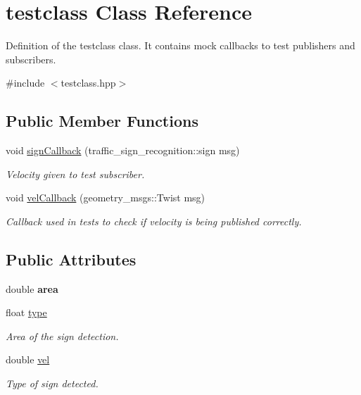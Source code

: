\hypertarget{classtestclass}{}\section{testclass Class Reference}
\label{classtestclass}


Definition of the testclass class. It contains mock callbacks to test publishers and subscribers.  




{\ttfamily \#include $<$testclass.\+hpp$>$}

\subsection*{Public Member Functions}
\begin{DoxyCompactItemize}
\item 
void \hyperlink{classtestclass_ae352e9aa7c67eefb21fb59bbef70102d}{sign\+Callback} (traffic\+\_\+sign\+\_\+recognition\+::sign msg)
\begin{DoxyCompactList}\small\item\em Velocity given to test subscriber. \end{DoxyCompactList}\item 
void \hyperlink{classtestclass_adcd92913608e31a80dccd729a0d8b0d6}{vel\+Callback} (geometry\+\_\+msgs\+::\+Twist msg)
\begin{DoxyCompactList}\small\item\em Callback used in tests to check if velocity is being published correctly. \end{DoxyCompactList}\end{DoxyCompactItemize}
\subsection*{Public Attributes}
\begin{DoxyCompactItemize}
\item 
double {\bfseries area}\hypertarget{classtestclass_ab9124711e687a763fea6b8c055b76b2a}{}\label{classtestclass_ab9124711e687a763fea6b8c055b76b2a}

\item 
float \hyperlink{classtestclass_a32d677c7bed3b81b99c354761f4c175a}{type}\hypertarget{classtestclass_a32d677c7bed3b81b99c354761f4c175a}{}\label{classtestclass_a32d677c7bed3b81b99c354761f4c175a}

\begin{DoxyCompactList}\small\item\em Area of the sign detection. \end{DoxyCompactList}\item 
double \hyperlink{classtestclass_a587a4bcccbe19e230cea401a870dea43}{vel}\hypertarget{classtestclass_a587a4bcccbe19e230cea401a870dea43}{}\label{classtestclass_a587a4bcccbe19e230cea401a870dea43}

\begin{DoxyCompactList}\small\item\em Type of sign detected. \end{DoxyCompactList}\end{DoxyCompactItemize}


